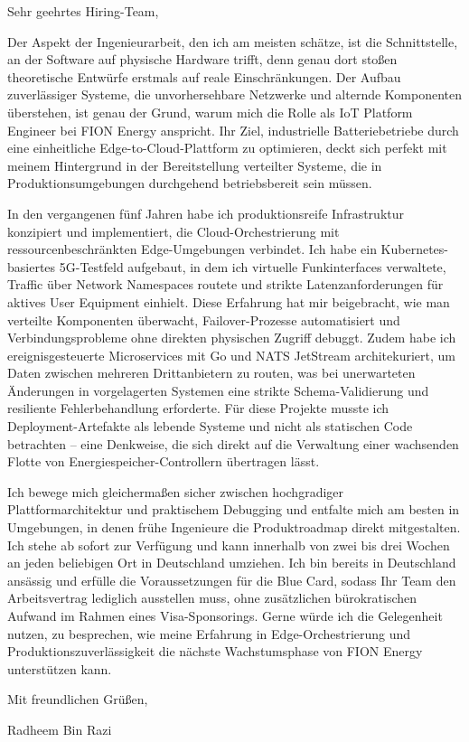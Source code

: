 \documentclass[11pt,a4paper]{coverletter}
\begin{document}
\opening{Sehr geehrtes Hiring-Team,}

Der Aspekt der Ingenieurarbeit, den ich am meisten schätze, ist die Schnittstelle, an der Software auf physische Hardware trifft, denn genau dort stoßen theoretische Entwürfe erstmals auf reale Einschränkungen. Der Aufbau zuverlässiger Systeme, die unvorhersehbare Netzwerke und alternde Komponenten überstehen, ist genau der Grund, warum mich die Rolle als IoT Platform Engineer bei FION Energy anspricht. Ihr Ziel, industrielle Batteriebetriebe durch eine einheitliche Edge-to-Cloud-Plattform zu optimieren, deckt sich perfekt mit meinem Hintergrund in der Bereitstellung verteilter Systeme, die in Produktionsumgebungen durchgehend betriebsbereit sein müssen.

In den vergangenen fünf Jahren habe ich produktionsreife Infrastruktur konzipiert und implementiert, die Cloud-Orchestrierung mit ressourcenbeschränkten Edge-Umgebungen verbindet. Ich habe ein Kubernetes-basiertes 5G-Testfeld aufgebaut, in dem ich virtuelle Funkinterfaces verwaltete, Traffic über Network Namespaces routete und strikte Latenzanforderungen für aktives User Equipment einhielt. Diese Erfahrung hat mir beigebracht, wie man verteilte Komponenten überwacht, Failover-Prozesse automatisiert und Verbindungsprobleme ohne direkten physischen Zugriff debuggt. Zudem habe ich ereignisgesteuerte Microservices mit Go und NATS JetStream architekuriert, um Daten zwischen mehreren Drittanbietern zu routen, was bei unerwarteten Änderungen in vorgelagerten Systemen eine strikte Schema-Validierung und resiliente Fehlerbehandlung erforderte. Für diese Projekte musste ich Deployment-Artefakte als lebende Systeme und nicht als statischen Code betrachten – eine Denkweise, die sich direkt auf die Verwaltung einer wachsenden Flotte von Energiespeicher-Controllern übertragen lässt.

Ich bewege mich gleichermaßen sicher zwischen hochgradiger Plattformarchitektur und praktischem Debugging und entfalte mich am besten in Umgebungen, in denen frühe Ingenieure die Produktroadmap direkt mitgestalten. Ich stehe ab sofort zur Verfügung und kann innerhalb von zwei bis drei Wochen an jeden beliebigen Ort in Deutschland umziehen. Ich bin bereits in Deutschland ansässig und erfülle die Voraussetzungen für die Blue Card, sodass Ihr Team den Arbeitsvertrag lediglich ausstellen muss, ohne zusätzlichen bürokratischen Aufwand im Rahmen eines Visa-Sponsorings. Gerne würde ich die Gelegenheit nutzen, zu besprechen, wie meine Erfahrung in Edge-Orchestrierung und Produktionszuverlässigkeit die nächste Wachstumsphase von FION Energy unterstützen kann.

\closing{Mit freundlichen Grüßen,}{Radheem Bin Razi}
\end{document}
